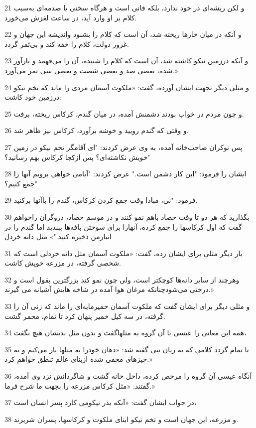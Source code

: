 \par 21 و لکن ریشه‌ای در خود ندارد، بلکه فانی است و هرگاه سختی یا صدمه‌ای به‌سبب کلام بر او وارد آید، در ساعت لغزش می‌خورد.
\par 22 و آنکه در میان خارها ریخته شد، آن است که کلام را بشنود واندیشه این جهان و غرور دولت، کلام را خفه کند و بی‌ثمر گردد.
\par 23 و آنکه درزمین نیکو کاشته شد، آن است که کلام را شنیده، آن را می‌فهمد و بارآور شده، بعضی صد و بعضی شصت و بعضی سی ثمر می‌آورد.»
\par 24 و مثلی دیگر بجهت ایشان آورده، گفت: «ملکوت آسمان مردی را ماند که تخم نیکو درزمین خود کاشت:
\par 25 و چون مردم در خواب بودند دشمنش آمده، در میان گندم، کرکاس ریخته، برفت.
\par 26 و وقتی که گندم رویید و خوشه برآورد، کرکاس نیز ظاهر شد.
\par 27 پس نوکران صاحب‌خانه آمده، به وی عرض کردند: "ای آقامگر تخم نیکو در زمین خویش نکاشته‌ای؟ پس ازکجا کرکاس بهم رسانید؟"
\par 28 ایشان را فرمود: "این کار دشمن است." عرض کردند: "آیامی خواهی برویم آنها را جمع کنیم؟"
\par 29 فرمود: "نی، مبادا وقت جمع کردن کرکاس، گندم را باآنها برکنید.
\par 30 بگذارید که هر دو تا وقت حصاد باهم نمو کنند و در موسم حصاد، دروگران راخواهم گفت که اول کرکاسها را جمع کرده، آنهارا برای سوختن بافه‌ها ببندید اما گندم را در انبارمن ذخیره کنید."» مثل دانه خردل
\par 31 بار دیگر مثلی برای ایشان زده، گفت: «ملکوت آسمان مثل دانه خردلی است که شخصی گرفته، در مزرعه خویش کاشت.
\par 32 وهرچند از سایر دانه‌ها کوچکتر است، ولی چون نمو کند بزرگترین بقول است و درختی می‌شودچنانکه مرغان هوا آمده در شاخه هایش آشیانه می گیرند.»
\par 33 و مثلی دیگر برای ایشان گفت که ملکوت آسمان خمیرمایه‌ای را ماند که زنی آن را گرفته، در سه کیل خمیر پنهان کرد تا تمام، مخمر گشت.
\par 34 همه این معانی را عیسی با آن گروه به مثلهاگفت و بدون مثل بدیشان هیچ نگفت،
\par 35 تا تمام گردد کلامی که به زبان نبی گفته شد: «دهان خودرا به مثلها باز می‌کنم و به چیزهای مخفی شده ازبنای عالم تنطق خواهم کرد.»
\par 36 آنگاه عیسی آن گروه را مرخص کرده، داخل خانه گشت و شاگردانش نزد وی آمده، گفتند: «مثل کرکاس مزرعه را بجهت ما شرح فرما.»
\par 37 در جواب ایشان گفت: «آنکه بذر نیکومی کارد پسر انسان است،
\par 38 و مزرعه، این جهان است و تخم نیکو ابنای ملکوت و کرکاسها، پسران شریرند.
